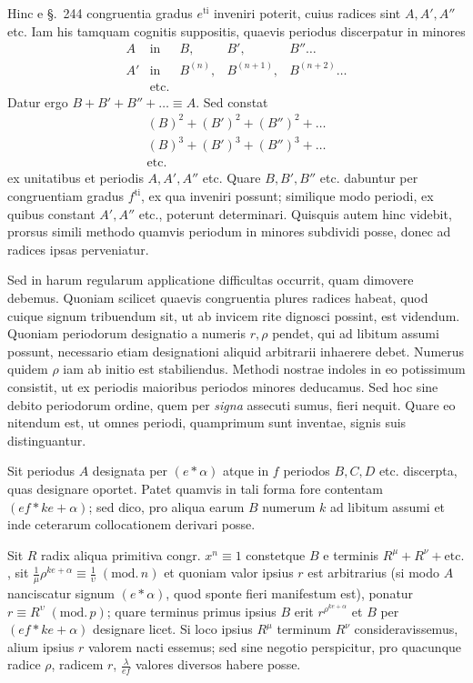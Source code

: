 Hinc e §.\ 244 congruentia gradus $e^{\mathrm{ti}}$ inveniri poterit, cuius radices sint $A,A',A''$ etc. Iam his tamquam cognitis suppositis, quaevis periodus discerpatur in minores
%
\[
\begin{array}{rclll}
A&\text{in}&B,&B',&B''\ldots\\
A'&\text{in}&B^{(n)},&B^{(n+1)},&B^{(n+2)}\ldots\\
&\text{etc.}
\end{array}
\]
Datur ergo $B+B'+B''+\ldots\equiv A$. Sed constat
\[
\begin{gathered}
(B)^2+(B')^2+(B'')^2+\ldots\\
(B)^3+(B')^3+(B'')^3+\ldots\\
\text{etc.}
\end{gathered}
\]
ex unitatibus et periodis $A,A',A''$ etc. Quare $B,B',B''$ etc. dabuntur per congruentiam gradus $f^{\mathrm{ti}}$, ex qua inveniri possunt; similique modo periodi, ex quibus constant $A',A''$ etc., poterunt determinari. Quisquis autem hinc videbit, prorsus simili methodo quamvis periodum in minores subdividi posse, donec ad radices ipsas perveniatur.

Sed in harum regularum applicatione difficultas occurrit, quam dimovere debemus. Quoniam scilicet quaevis congruentia plures radices habeat, quod cuique signum tribuendum sit, ut ab invicem rite dignosci possint, est videndum. Quoniam periodorum designatio a numeris $r,\rho$ pendet, qui ad libitum assumi possunt, necessario etiam designationi aliquid arbitrarii inhaerere debet. Numerus quidem $\rho$ iam ab initio est stabiliendus. Methodi nostrae indoles in eo potissimum consistit, ut ex periodis maioribus periodos minores deducamus. Sed hoc sine debito periodorum ordine, quem per \emph{signa} assecuti sumus, fieri nequit. Quare eo nitendum est, ut omnes periodi, quamprimum sunt inventae, signis suis distinguantur.

Sit periodus $A$ designata per $(e\ast\alpha)$ atque in $f$ periodos $B,C,D$ etc. discerpta, quas designare oportet. Patet quamvis in tali forma fore contentam $(ef\ast ke+\alpha)$; sed dico, pro aliqua earum $B$ numerum $k$ ad libitum assumi et inde ceterarum collocationem derivari posse.

Sit $R$ radix aliqua primitiva congr. $x^n\equiv1$ constetque $B$ e terminis $R^\mu+R^\nu+\text{etc.}$, sit $\frac1\mu\rho^{ke+\alpha}\equiv\frac1\upsilon\;(\mathrm{mod.}\,n)$ et quoniam valor ipsius $r$ est arbitrarius (si modo $A$ nanciscatur signum $(e\ast\alpha)$, quod sponte fieri manifestum est), ponatur $r\equiv R^\upsilon\;(\mathrm{mod.}\,p)$; quare terminus primus ipsius $B$ erit $r^{\rho^{ke+\alpha}}$ et $B$ per
%
$(ef\ast ke+\alpha)$ designare licet. Si loco ipsius $R^\mu$ terminum $R^\nu$ consideravissemus, alium ipsius $r$ valorem nacti essemus; sed sine negotio perspicitur, pro quacunque radice $\rho$, radicem $r$, $\frac\lambda{ef}$ valores diversos habere posse.

